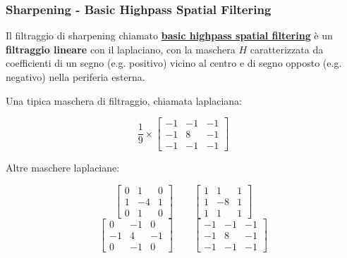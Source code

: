 \documentclass[a4paper]{article}
\begin{document}
	\newpage
	
	\subsubsection{Sharpening - Basic Highpass Spatial Filtering}
	
	Il filtraggio di sharpening chiamato \textcolor{Red3}{\textbf{\underline{basic highpass spatial filtering}}} è un \textbf{filtraggio lineare} con il laplaciano, con la maschera $H$ caratterizzata da coefficienti di un segno (e.g. positivo) vicino al centro e di segno opposto (e.g. negativo) nella periferia esterna.\newline
	
	\noindent
	Una tipica maschera di filtraggio, chiamata laplaciana:
	
	\begin{equation*}
		\dfrac{1}{9} \times \begin{bmatrix}
			-1 & -1 & -1 \\
			-1 & 8  & -1 \\
			-1 & -1 & -1
		\end{bmatrix}
	\end{equation*}

	\noindent
	Altre maschere laplaciane:
	
	\begin{equation*}
		\begin{bmatrix}
			0 & 1  & 0 \\
			1 & -4 & 1 \\
			0 & 1  & 0
		\end{bmatrix}
		\hspace{2em}
		\begin{bmatrix}
			1 & 1  & 1 \\
			1 & -8 & 1 \\
			1 & 1  & 1
		\end{bmatrix}
	\end{equation*}
	\begin{equation*}
		\begin{bmatrix}
			0  & -1 & 0 \\
			-1 & 4  & -1 \\
			0  & -1 & 0
		\end{bmatrix}
		\hspace{2em}
		\begin{bmatrix}
			-1 & -1 & -1 \\
			-1 &  8 & -1 \\
			-1 & -1 & -1
		\end{bmatrix}
	\end{equation*}
\end{document}
